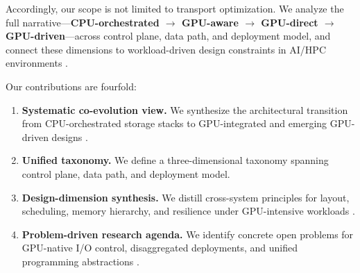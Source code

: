 Accordingly, our scope is not limited to transport optimization. We analyze the full narrative---\textbf{CPU-orchestrated $\rightarrow$ GPU-aware $\rightarrow$ GPU-direct $\rightarrow$ GPU-driven}---across control plane, data path, and deployment model, and connect these dimensions to workload-driven design constraints in AI/HPC environments \cite{nvmeof_spec,pcie_spec,liu2017rackscale,murray2021tfdata,zhong2024distserve}.

Our contributions are fourfold:
\begin{enumerate}
    \item \textbf{Systematic co-evolution view.} We synthesize the architectural transition from CPU-orchestrated storage stacks to GPU-integrated and emerging GPU-driven designs \cite{nvidia_gds_blog,silberstein2013gpufs,qureshi2023bam}.
    \item \textbf{Unified taxonomy.} We define a three-dimensional taxonomy spanning control plane, data path, and deployment model.
    \item \textbf{Design-dimension synthesis.} We distill cross-system principles for layout, scheduling, memory hierarchy, and resilience under GPU-intensive workloads \cite{geminifs2025,rajbhandari2021zeroinfinity,nvidia_gds_overview}.
    \item \textbf{Problem-driven research agenda.} We identify concrete open problems for GPU-native I/O control, disaggregated deployments, and unified programming abstractions \cite{kwon2023vllm,zhong2024distserve,zhang2025hpcstoragesurvey}.
\end{enumerate}
